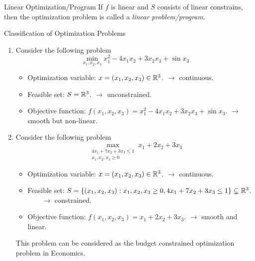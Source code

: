 \begin{df}{Linear Optimization/Program}
	If $f$ is linear and $S$ consists of linear constrains, then the optimization problem is called a \textit{linear problem/program}.	
\end{df}
\begin{eg}{Classification of Optimization Problems}
	\begin{enumerate}
		\item Consider the following problem \[\min_{x_1,x_2,x_3}x_1^2-4x_1x_2+3x_2x_3+\sin{x_3}\]
		\begin{sol}
			\begin{itemize}
				\item Optimization variable: $x=(x_1,x_2,x_3)\in{\mathbb{R}}^3$. $\longrightarrow$ continuous.
				\item Feasible set: $S={\mathbb{R}}^3$. $\longrightarrow$ unconstrained.
				\item Objective function: $f(x_1,x_2,x_3)=x_1^2-4x_1x_2+3x_2x_3+\sin{x_3}$. $\longrightarrow$ smooth but non-linear. 
			\end{itemize}	
		\end{sol}
		\item Consider the following problem \[\max_{\substack{4x_1+7x_2+3x_3\leq1 \\ x_1,x_2,x_3\geq0}}x_1+2x_2+3x_3\]
		\begin{sol}
			\begin{itemize}
				\item Optimization variable: $x=(x_1,x_2,x_3)\in{\mathbb{R}}^3$. $\longrightarrow$ continuous.
				\item Feasible set: $S=\qty{(x_1,x_2,x_3):x_1,x_2,x_3\geq0, 4x_1+7x_2+3x_3\leq 1}\subsetneq{\mathbb{R}}^3$. $\qquad\longrightarrow$ constrained.
				\item Objective function: $f(x_1,x_2,x_3)=x_1+2x_2+3x_3$. $\longrightarrow$ smooth and linear. 
			\end{itemize}	
		\end{sol}
		\begin{rmk}
			This problem can be considered as the budget constrained optimization problem in Economics. 	
		\end{rmk}


\end{enumerate}
\end{eg}
